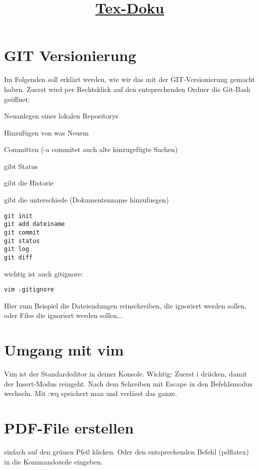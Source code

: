 \documentclass[11pt]{scrartcl}
\begin{document}
\title{\underline{Tex-Doku}}
\maketitle
\section{GIT Versionierung}
Im Folgenden soll erklärt werden, wie wir das mit der GIT-Versionierung gemacht haben.
Zuerst wird per Rechtsklick auf den entsprechenden Ordner die Git-Bash geöffnet:

Neuanlegen eines lokalen Repositorys

Hinzufügen von was Neuem

Committen (-a commitet auch alte hinzugefügte Sachen)

gibt Status

gibt die Historie

gibt die unterschiede (Dokumentenname hinzufuegen)
\begin{lstlisting}
git init
git add dateiname
git commit
git status
git log
git diff
\end{lstlisting}

wichtig ist auch gitignore:
\begin{lstlisting}
vim .gitignore
\end{lstlisting}
Hier zum Beispiel die Dateiendungen reinschreiben, die ignoriert werden sollen, oder Files die ignoriert werden sollen...
\section{Umgang mit vim}
Vim ist der Standardeditor in deiner Konsole. Wichtig: Zuerst i drücken, damit der Insert-Modus reingeht. Nach dem Schreiben mit Escape in den Befehlsmodus wechseln. Mit :wq speichert man und verlässt das ganze.
\section{PDF-File erstellen}
einfach auf den grünen Pfeil klicken. Oder den entsprechenden Befehl (pdflatex) in die Kommandozeile eingeben.
\end{document}
